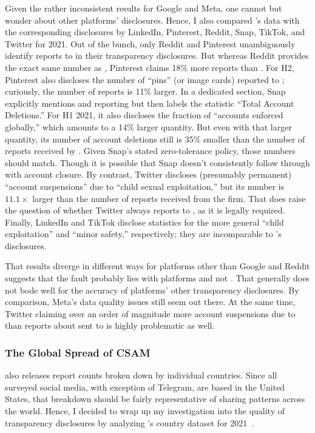 Given the rather inconsistent results for Google and Meta, one cannot but wonder
about other platforms' disclosures. Hence, I also compared 's data with
the corresponding disclosures by LinkedIn, Pinterest, Reddit, Snap, TikTok, and
Twitter for 2021. Out of the bunch, only Reddit and Pinterest unambiguously
identify  reports to  in their transparency disclosures. But
whereas Reddit provides the exact same number as , Pinterest claims 18\%
more reports than . For H2, Pinterest also discloses the number of
``pins'' (or image cards) reported to ; curiously, the number of reports
is 11\% larger. In a dedicated section, Snap explicitly mentions  and
 reporting but then labels the statistic ``Total Account Deletions.'' For
H1 2021, it also discloses the fraction of ``accounts enforced globally,'' which
amounts to a 14\% larger quantity. But even with that larger quantity, its
number of account deletions still is 35\% smaller than the number of reports
received by . Given Snap's stated zero-tolerance policy, those numbers
should match. Though it is possible that Snap doesn't consistently follow
through with account closure. By contrast, Twitter discloses (presumably
permanent) ``account suspensions'' due to ``child sexual exploitation,'' but its
number is $11.1\times$ larger than the number of reports 
received from the firm. That does raise the question of whether Twitter always
reports  to , as it is legally required. Finally, LinkedIn and
TikTok disclose statistics for the more general ``child exploitation'' and
``minor safety,'' respectively; they are incomparable to 's disclosures.

That results diverge in different ways for platforms other than Google and
Reddit suggests that the fault probably lies with platforms and not . That
generally does not bode well for the accuracy of platforms' other transparency
disclosures. By comparison, Meta's data quality issues still seem out there. At
the same time, Twitter claiming over an order of magnitude more account
suspensions due to  than reports about  sent to  is highly
problematic as well.


\subsubsection{The Global Spread of CSAM}

 also releases report counts broken down by individual countries. Since
all surveyed social media, with exception of Telegram, are based in the United
States, that breakdown should be fairly representative of  sharing
patterns across the world. Hence, I decided to wrap up my investigation into the
quality of transparency disclosures by analyzing 's country dataset for
2021~\cite{NcmecByCountry2021}.

